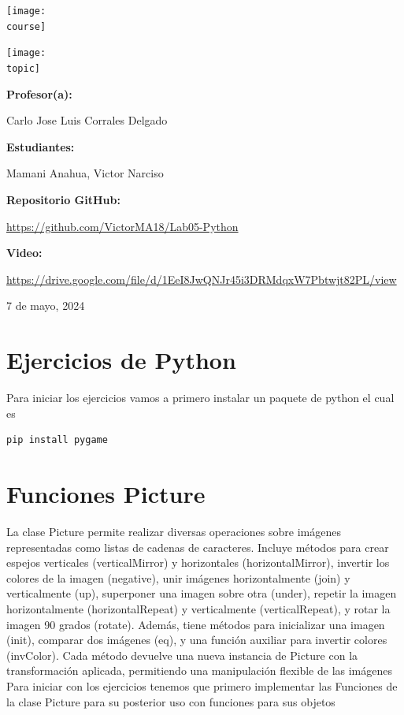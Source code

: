 \documentclass[10pt, a4paper]{article}
\newcommand{\course}{img/web_programming}
\newcommand{\topic}{img/Python.png}
\newcommand{\professor}{Carlo Jose Luis Corrales Delgado}
\newcommand{\students}{Mamani Anahua, Victor Narciso}
\newcommand{\github}{https://github.com/VictorMA18/Lab05-Python}
\newcommand{\video}{https://drive.google.com/file/d/1EeI8JwQNJr45i3DRMdqxW7Pbtwjt82PL/view}
\newcommand{\mydate}{7 de mayo, 2024}
\begin{document}
\begin{titlepage}
	\centering
	\texttt{[image: \\course]} \par
  \vfill \vfill
	\texttt{[image: \\topic]}\par
  \vfill \vfill
  {\textbf{Profesor(a):} \par}
	\professor \vfill
  {\textbf{Estudiantes:} \par}
	\students \vfill
  {\textbf{Repositorio GitHub:} \par}
  \href{\github}{\github} \vfill
  {\textbf{Video:} \par}
  \href{\video}{\video} \vfill
	{\large \mydate \par}
\end{titlepage}

\section{Ejercicios de Python}
Para iniciar los ejercicios vamos a primero instalar un paquete de python el cual es 
\begin{lstlisting}[language=bash]
  pip install pygame
\end{lstlisting} 

\section{Funciones Picture}
La clase Picture permite realizar diversas operaciones sobre imágenes representadas como listas de cadenas de caracteres. Incluye métodos para crear espejos verticales (verticalMirror) y horizontales (horizontalMirror), invertir los colores de la imagen (negative), unir imágenes horizontalmente (join) y verticalmente (up), superponer una imagen sobre otra (under), repetir la imagen horizontalmente (horizontalRepeat) y verticalmente (verticalRepeat), y rotar la imagen 90 grados (rotate). Además, tiene métodos para inicializar una imagen (init), comparar dos imágenes (eq), y una función auxiliar para invertir colores (invColor). Cada método devuelve una nueva instancia de Picture con la transformación aplicada, permitiendo una manipulación flexible de las imágenes
\singlespacing
Para iniciar con los ejercicios tenemos que primero implementar las Funciones de la clase Picture para su posterior uso con funciones para sus objetos
\end{document}
